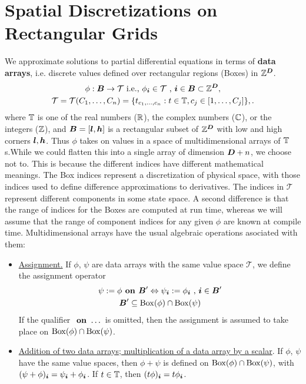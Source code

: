 \documentclass[12pt]{article}
\begin{document}
\section{Spatial Discretizations on Rectangular Grids}

We approximate solutions to partial differential equations in terms of \textbf{data arrays}, i.e. discrete values defined over rectangular regions (Boxes) in $\mathbb{Z}^{\boldsymbol{D}}$.
\begin{gather}
\phi:{\boldsymbol{B}} \rightarrow \mathcal{T} \hbox{ i.e., } \phi_{\boldsymbol{i}} \in \mathcal{T} \hbox{ , } 
{\boldsymbol{i}} \in {\boldsymbol{B}} \subset \mathbb{Z}^{\boldsymbol{D}} , \label{eqn:rectArr}\\ 
\mathcal{T} = \mathcal{T}(C_1, \dots , C_n) = \{t_{c_1, \dots , c_n}: t \in \mathbb{T}, c_j \in [1, \dots , C_j]\}, \label{eqn:codomain}.
\end{gather}
where $\mathbb{T}$ is one of the real numbers ($\mathbb{R}$), the complex numbers ($\mathbb{C}$), or the integers ($\mathbb{Z}$), and ${\boldsymbol{B}} = [{\boldsymbol{l}},{\boldsymbol{h}}]$ is a rectangular subset of $\mathbb{Z}^{\boldsymbol{D}}$ with low and high corners ${\boldsymbol{l}},{\boldsymbol{h}}$. Thus $\phi$ takes on values in a space of multidimensional arrays of $\mathbb{T}$s.While we could flatten this into a single array of dimension ${\boldsymbol{D}} + n$, we choose not to. This is because the different indices have different mathematical meanings. The Box indices represent a discretization of physical space, with those indices used to define difference approximations to derivatives. The indices in $\mathcal{T}$ represent different components in some state space. A second difference is that the range of indices for the Boxes are computed at run time, whereas we will assume that the range of component indices for any given $\phi$ are known at compile time. Multidimensional arrays have the usual algebraic operations asociated with them:
\begin{itemize}
\item
\underline{Assignment.} If $\phi$, $\psi$ are data arrays with the same value space $\mathcal{T}$, we define the assignment operator 
\begin{gather*}
\psi := \phi \hbox{\bf{ on }} {\boldsymbol{B}}' \Leftrightarrow \psi_{\boldsymbol{i}} := \phi_{\boldsymbol{i}} \hbox{ , } {\boldsymbol{i}} \in {\boldsymbol{B}}'\\
 {\boldsymbol{B}}'\subseteq {\rm Box}(\phi) \cap {\rm Box}(\psi)
\end{gather*}
If the qualifier $\hbox{\bf{ on }} \dots$ is omitted, then the assignment is assumed to take place on  ${\rm Box}(\phi) \cap {\rm Box}(\psi)$.
\item
\underline{Addition of two data arrays; multiplication of a data array by a scalar}. If $\phi$, $\psi$ have the same value spaces, then $\phi + \psi$ is defined on ${\rm Box}(\phi) \cap {\rm Box}(\psi)$, with 
$(\psi + \phi)_{\boldsymbol{i}} = \psi_{\boldsymbol{i}} + \phi_{\boldsymbol{i}}$. If $t \in \mathbb{T}$, then 
$(t \phi )_{\boldsymbol{i}} = t \phi_{\boldsymbol{i}}$. 
\end{itemize}
\end{document}
